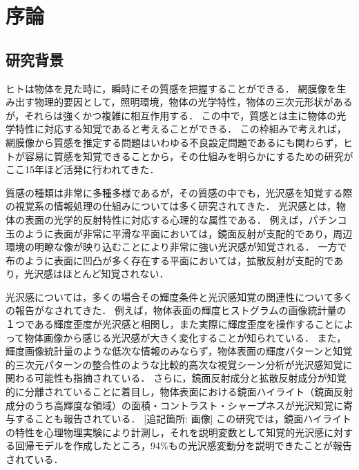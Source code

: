 \chapter{序論}
    \section{研究背景}
        ヒトは物体を見た時に，瞬時にその質感を把握することができる．
        網膜像を生み出す物理的要因として，照明環境，物体の光学特性，物体の三次元形状があるが，それらは強くかつ複雑に相互作用する．
        この中で，質感とは主に物体の光学特性に対応する知覚であると考えることができる．
        この枠組みで考えれば，網膜像から質感を推定する問題はいわゆる不良設定問題であるにも関わらず，ヒトが容易に質感を知覚できることから，その仕組みを明らかにするための研究がここ15年ほど活発に行われてきた．

        質感の種類は非常に多種多様であるが\cite{Material}，その質感の中でも，光沢感を知覚する際の視覚系の情報処理の仕組みについては多く研究されてきた．
        光沢感とは，物体の表面の光学的反射特性に対応する心理的な属性である．
        例えば，パチンコ玉のように表面が非常に平滑な平面においては，鏡面反射が支配的であり，周辺環境の明瞭な像が映り込むことにより非常に強い光沢感が知覚される．
        一方で布のように表面に凹凸が多く存在する平面においては，拡散反射が支配的であり，光沢感はほとんど知覚されない．

        光沢感については，多くの場合その輝度条件と光沢感知覚の関連性について多くの報告がなされてきた．
        例えば，物体表面の輝度ヒストグラムの画像統計量の１つである輝度歪度が光沢感と相関し，また実際に輝度歪度を操作することによって物体画像から感じる光沢感が大きく変化することが知られている\cite{Motoyoshi}．
        また，輝度画像統計量のような低次な情報のみならず，物体表面の輝度パターンと知覚的三次元パターンの整合性のような比較的高次な視覚シーン分析が光沢感知覚に関わる可能性も指摘されている\cite{Marlow1}．
        さらに，鏡面反射成分と拡散反射成分が知覚的に分離されていることに着目し，物体表面における鏡面ハイライト（鏡面反射成分のうち高輝度な領域）の面積・コントラスト・シャープネスが光沢知覚に寄与することも報告されている\cite{Marlow2}．
        [追記箇所: 画像]
        この研究では，鏡面ハイライトの特性を心理物理実験により計測し，それを説明変数として知覚的光沢感に対する回帰モデルを作成したところ，94\%もの光沢感変動分を説明できたことが報告されている．

